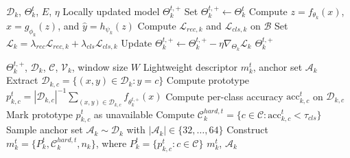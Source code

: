 \documentclass[conference]{IEEEtran}
\begin{document}
\begin{algorithm}[t]
\caption{Local Representation Learner Update at Client $k$}
\label{alg:local_update}
\footnotesize
\begin{algorithmic}[1]
\REQUIRE $\mathcal{D}_k$, $\Theta_k^t$, $E$, $\eta$
\ENSURE Locally updated model $\Theta_k^{t,+}$
\STATE Set $\Theta_k^{t,+}\leftarrow \Theta_k^t$
        \STATE Compute $z=f_{\theta_k}(x)$, $\hat{x}=g_{\phi_k}(z)$, and $\hat{y}=h_{\psi_k}(z)$
        \STATE Compute $\mathcal{L}_{rec,k}$ and $\mathcal{L}_{cls,k}$ on $\mathcal{B}$
        \STATE Set $\mathcal{L}_{k}=\lambda_{rec}\mathcal{L}_{rec,k}+\lambda_{cls}\mathcal{L}_{cls,k}$
        \STATE Update $\Theta_k^{t,+}\leftarrow\Theta_k^{t,+}-\eta\nabla_{\Theta_k}\mathcal{L}_{k}$
    \ENDFOR
\ENDFOR
\RETURN $\Theta_k^{t,+}$
\end{algorithmic}
\end{algorithm}

\begin{algorithm}[t]
\caption{Lightweight Descriptor Construction at Client $k$}
\label{alg:descriptor}
\footnotesize
\begin{algorithmic}[1]
\REQUIRE $\Theta_k^{t,+}$, $\mathcal{D}_k$, $\mathcal{C}$, $\mathcal{V}_k$, window size $W$
\ENSURE Lightweight descriptor $m_k^t$, anchor set $\mathcal{A}_k$
    \STATE Extract $\mathcal{D}_{k,c}=\{(x,y)\in\mathcal{D}_k:y=c\}$
        \STATE Compute prototype $p_{k,c}^{t}=|\mathcal{D}_{k,c}|^{-1}\sum_{(x,y)\in\mathcal{D}_{k,c}} f_{\theta_k^{t,+}}(x)$
        \STATE Compute per-class accuracy $\mathrm{acc}_{k,c}^t$ on $\mathcal{D}_{k,c}$
    \ELSE
        \STATE Mark prototype $p_{k,c}^{t}$ as unavailable
    \ENDIF
\ENDFOR
\STATE Compute $\mathcal{C}_k^{hard,t}=\{c\in\mathcal{C}:\mathrm{acc}_{k,c}^t<\tau_{cls}\}$
\STATE Sample anchor set $\mathcal{A}_k \sim \mathcal{D}_k$ with $|\mathcal{A}_k|\in\{32,\dots,64\}$
\STATE Construct $m_k^t=\{P_k^t,\mathcal{C}_k^{hard,t},n_k\}$, where $P_k^t=\{p_{k,c}^{t}:c\in\mathcal{C}\}$
\RETURN $m_k^t$, $\mathcal{A}_k$
\end{algorithmic}
\end{algorithm}
\end{document}
